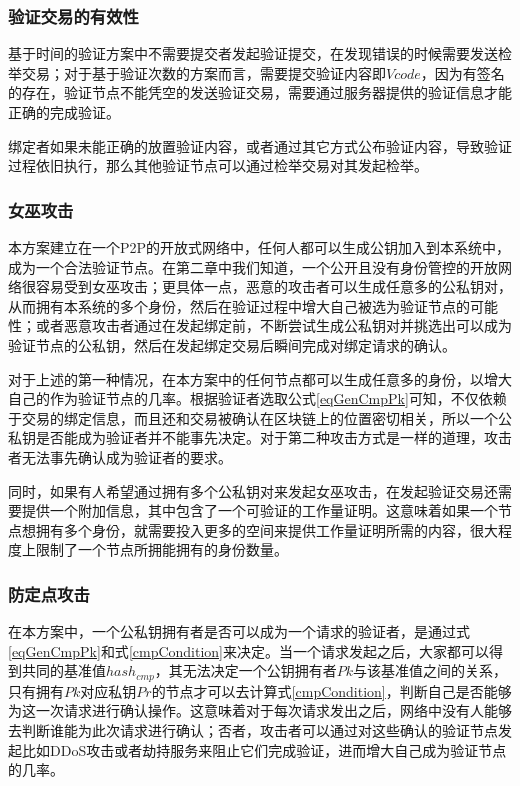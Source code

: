 \subsubsection{验证交易的有效性}

基于时间的验证方案中不需要提交者发起验证提交，在发现错误的时候需要发送检举交易；对于基于验证次数的方案而言，需要提交验证内容即$Vcode$，因为有签名的存在，验证节点不能凭空的发送验证交易，需要通过服务器提供的验证信息才能正确的完成验证。

绑定者如果未能正确的放置验证内容，或者通过其它方式公布验证内容，导致验证过程依旧执行，那么其他验证节点可以通过检举交易对其发起检举。


\subsubsection{女巫攻击}

本方案建立在一个P2P的开放式网络中，任何人都可以生成公钥加入到本系统中，成为一个合法验证节点。在第二章中我们知道，一个公开且没有身份管控的开放网络很容易受到女巫攻击；更具体一点，恶意的攻击者可以生成任意多的公私钥对，从而拥有本系统的多个身份，然后在验证过程中增大自己被选为验证节点的可能性；或者恶意攻击者通过在发起绑定前，不断尝试生成公私钥对并挑选出可以成为验证节点的公私钥，然后在发起绑定交易后瞬间完成对绑定请求的确认。

对于上述的第一种情况，在本方案中的任何节点都可以生成任意多的身份，以增大自己的作为验证节点的几率。根据验证者选取公式\ref{eqGenCmpPk}可知，不仅依赖于交易的绑定信息，而且还和交易被确认在区块链上的位置密切相关，所以一个公私钥是否能成为验证者并不能事先决定。对于第二种攻击方式是一样的道理，攻击者无法事先确认成为验证者的要求。

同时，如果有人希望通过拥有多个公私钥对来发起女巫攻击，在发起验证交易还需要提供一个附加信息，其中包含了一个可验证的工作量证明。这意味着如果一个节点想拥有多个身份，就需要投入更多的空间来提供工作量证明所需的内容，很大程度上限制了一个节点所拥能拥有的身份数量。                          

\subsubsection{防定点攻击}

在本方案中，一个公私钥拥有者是否可以成为一个请求的验证者，是通过式\ref{eqGenCmpPk}和式\ref{cmpCondition}来决定。当一个请求发起之后，大家都可以得到共同的基准值$hash_{cmp}$，其无法决定一个公钥拥有者$Pk$与该基准值之间的关系，只有拥有$Pk$对应私钥$Pr$的节点才可以去计算式\ref{cmpCondition}，判断自己是否能够为这一次请求进行确认操作。这意味着对于每次请求发出之后，网络中没有人能够去判断谁能为此次请求进行确认；否者，攻击者可以通过对这些确认的验证节点发起比如DDoS攻击或者劫持服务来阻止它们完成验证，进而增大自己成为验证节点的几率。

